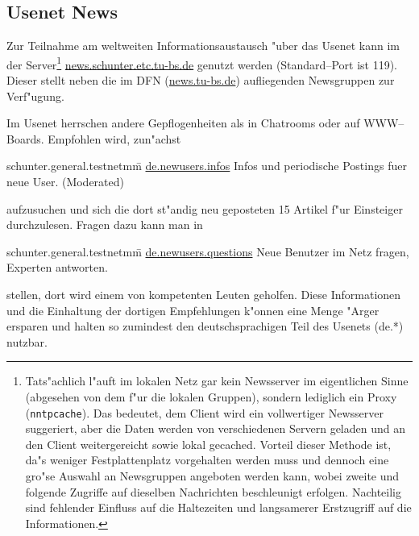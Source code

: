 \subsection{Usenet News}

Zur Teilnahme am weltweiten Informationsaustausch "uber das \glossar Usenet
kann im \snev der \glossar Server\footnote{Tats"achlich l"auft im lokalen
  Netz gar kein Newsserver im eigentlichen Sinne (abgesehen von dem f"ur die
  lokalen Gruppen), sondern lediglich ein \glossar Proxy
  (\texttt{nntpcache}). Das bedeutet, dem \glossar Client wird ein
  vollwertiger Newsserver suggeriert, aber die Daten werden von verschiedenen
  \glossar Servern geladen und an den Client weitergereicht sowie lokal
  gecached. Vorteil dieser Methode ist, da"s weniger Festplattenplatz
  vorgehalten werden muss und dennoch eine gro"se Auswahl an Newsgruppen
  angeboten werden kann, wobei zweite und folgende Zugriffe auf dieselben
  Nachrichten beschleunigt erfolgen. Nachteilig sind fehlender Einfluss auf
  die Haltezeiten und langsamerer Erstzugriff auf die Informationen.}
\url{news.schunter.etc.tu-bs.de} genutzt werden (Standard--Port ist 119).
Dieser stellt neben die im DFN (\url{news.tu-bs.de}) aufliegenden
Newsgruppen%
zur Verf"ugung.

Im Usenet herrschen andere Gepflogenheiten als in Chatrooms oder auf
WWW--Boards. Empfohlen wird, zun"achst 
\begin{tabbing}
  schunter.general.testnetmm\=\kill
  \url{de.newusers.infos} \> Infos und periodische Postings fuer neue User. (Moderated)
\end{tabbing}
aufzusuchen und sich die dort st"andig neu geposteten 15 Artikel f"ur
Einsteiger durchzulesen. Fragen dazu kann man in
\begin{tabbing}
  schunter.general.testnetmm\=\kill
  \url{de.newusers.questions} \> Neue Benutzer im Netz fragen, Experten antworten.
\end{tabbing}
stellen, dort wird einem von kompetenten Leuten geholfen. Diese Informationen
und die Einhaltung der dortigen Empfehlungen k"onnen eine Menge "Arger
ersparen und halten so zumindest den deutschsprachigen Teil des Usenets (de.*)
nutzbar.

